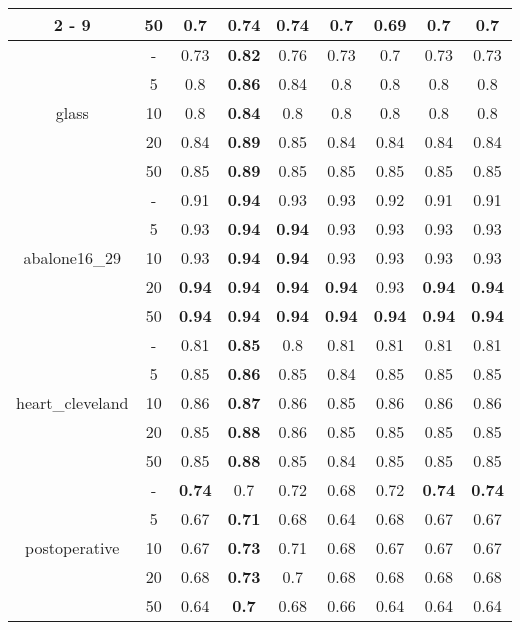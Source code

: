 \documentclass{article}%
\begin{document}
\begin{tabular}{c|c|ccccccc}
\cline{2%
-%
9}%
&50&0.7&\textbf{0.74}&\textbf{0.74}&0.7&0.69&0.7&0.7\\%
\hline%
\multirow{5}{*}{glass}&{-}&0.73&\textbf{0.82}&0.76&0.73&0.7&0.73&0.73\\%
\cline{2%
-%
9}%
&5&0.8&\textbf{0.86}&0.84&0.8&0.8&0.8&0.8\\%
\cline{2%
-%
9}%
&10&0.8&\textbf{0.84}&0.8&0.8&0.8&0.8&0.8\\%
\cline{2%
-%
9}%
&20&0.84&\textbf{0.89}&0.85&0.84&0.84&0.84&0.84\\%
\cline{2%
-%
9}%
&50&0.85&\textbf{0.89}&0.85&0.85&0.85&0.85&0.85\\%
\hline%
\multirow{5}{*}{abalone16\_29}&{-}&0.91&\textbf{0.94}&0.93&0.93&0.92&0.91&0.91\\%
\cline{2%
-%
9}%
&5&0.93&\textbf{0.94}&\textbf{0.94}&0.93&0.93&0.93&0.93\\%
\cline{2%
-%
9}%
&10&0.93&\textbf{0.94}&\textbf{0.94}&0.93&0.93&0.93&0.93\\%
\cline{2%
-%
9}%
&20&\textbf{0.94}&\textbf{0.94}&\textbf{0.94}&\textbf{0.94}&0.93&\textbf{0.94}&\textbf{0.94}\\%
\cline{2%
-%
9}%
&50&\textbf{0.94}&\textbf{0.94}&\textbf{0.94}&\textbf{0.94}&\textbf{0.94}&\textbf{0.94}&\textbf{0.94}\\%
\hline%
\multirow{5}{*}{heart\_cleveland}&{-}&0.81&\textbf{0.85}&0.8&0.81&0.81&0.81&0.81\\%
\cline{2%
-%
9}%
&5&0.85&\textbf{0.86}&0.85&0.84&0.85&0.85&0.85\\%
\cline{2%
-%
9}%
&10&0.86&\textbf{0.87}&0.86&0.85&0.86&0.86&0.86\\%
\cline{2%
-%
9}%
&20&0.85&\textbf{0.88}&0.86&0.85&0.85&0.85&0.85\\%
\cline{2%
-%
9}%
&50&0.85&\textbf{0.88}&0.85&0.84&0.85&0.85&0.85\\%
\hline%
\multirow{5}{*}{postoperative}&{-}&\textbf{0.74}&0.7&0.72&0.68&0.72&\textbf{0.74}&\textbf{0.74}\\%
\cline{2%
-%
9}%
&5&0.67&\textbf{0.71}&0.68&0.64&0.68&0.67&0.67\\%
\cline{2%
-%
9}%
&10&0.67&\textbf{0.73}&0.71&0.68&0.67&0.67&0.67\\%
\cline{2%
-%
9}%
&20&0.68&\textbf{0.73}&0.7&0.68&0.68&0.68&0.68\\%
\cline{2%
-%
9}%
&50&0.64&\textbf{0.7}&0.68&0.66&0.64&0.64&0.64\\%
\hline%
\end{tabular}

%
\end{document}

